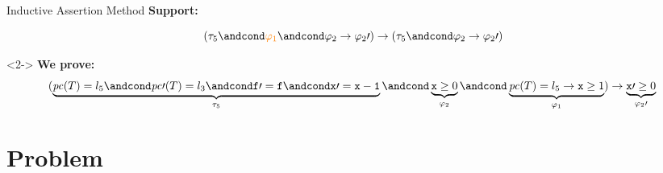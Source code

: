\documentclass[10pt,notes,compress,usetitleprogressbar,aspectratio=1610]{beamer}
\newcommand{\pc}{\ensuremath{\mathit{pc}}\xspace}
\begin{document}
\begin{frame}{Inductive Assertion Method}
	\textbf{Support:}


	\[
		(\tau_5 \andcond \textcolor{orange}{\varphi_1} \andcond \varphi_2 \to \varphi_2\prime ) \rightarrow ( \tau_5 \andcond \varphi_2\to\varphi_2\prime )
	\]

	\begin{block}<2->{}
	\vspace{-1cm}
		\textbf{We prove:}
		\begin{equation*}
			(
				\underbrace{\pc(T) = l_5 \andcond \pc\prime (T) = l_3 \andcond \mathtt{f\prime =f} \andcond \mathtt{x\prime =x-1}}_{\tau_5} \andcond \underbrace{\mathtt{x} \geq 0}_{\varphi_2} \andcond \underbrace{\pc(T) = l_5 \to \mathtt{x} \geq 1}_{\varphi_1}
			) 
				\to \underbrace{\mathtt{x}\prime  \geq 0}_{\varphi_2\prime }\\\\
		\end{equation*}
	\end{block}



\end{frame}


\section{Problem}

\end{document}
